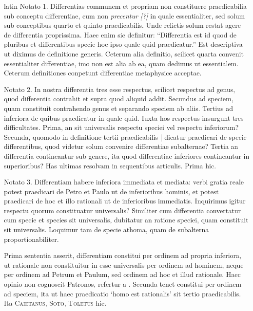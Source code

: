 \begin{otherlanguage*}{latin}
\pstart
Notato 1. Differentias communem et propriam non constituere praedicabilia sub conceptu differentiae, cum non \emph{precentur [?]} in quale essentialiter, sed solum sub conceptibus quarto et quinto praedicabilis. Unde relictis solum restat agere de differentia proprissima. Haec enim sic definitur:
\enquote{Differentia est id quod de pluribus et differentibus specie hoc ipso quale quid praedicatur.} Est descriptiva ut diximus de definitione generis. Ceterum alia definitio, scilicet quarta convenit essentialiter differentiae, imo non est alia ab ea, quam dedimus ut essentialem. Ceterum definitiones conpetunt differentiae metaphysice acceptae. 
\pend

\pstart
Notato 2. In nostra differentia tres esse respectus, scilicet respectus ad genus, quod differentia contrahit et supra quod aliquid addit. Secundus ad speciem, quam constituit contrahendo genus et separando speciem ab aliis. Tertius ad inferiora de quibus praedicatur in quale quid. Iuxta hos respectus insurgunt tres difficultates. Prima, an sit universalis respectu speciei vel respectu inferiorum? Secunda, quomodo in definitione tertii praedicabilis \textnormal{|} dicatur praedicari de specie differentibus, quod videtur solum convenire differentiae subalternae? Tertia an differentia contineantur sub genere, ita quod differentiae inferiores contineantur in superioribus? Has ultimas resolvam in sequentibus articulis. Prima hic. 
\pend

\pstart
Notato 3. Differentiam habere inferiora immediata et mediata:
verbi gratia reale potest praedicari de Petro et Paulo ut de inferioribus hominis, et potest praedicari de hoc et illo rationali ut de inferioribus immediatis. Inquirimus igitur respectu quorum constituatur universalis? Similiter cum differentia convertatur cum specie et species sit universalis, dubitatur an ratione speciei, quam constituit sit universalis. Loquimur tam de specie athoma, quam de subalterna proportionabiliter. 
\pend

\pstart
Prima sententia asserit, differentiam constitui per ordinem ad propria inferiora, ut rationale non constituitur in esse universalis per ordinem ad hominem, neque per ordinem ad Petrum et Paulum, sed ordinem ad hoc et illud rationale. Haec opinio non cognoscit Patronos, refertur a . Secunda tenet constitui per ordinem ad speciem, ita ut haec praedicatio `homo est rationalis' sit tertio praedicabilis. Ita \textsc{Caietanus}, \textsc{Soto}, \textsc{Toletus} hic. 
\pend


\end{otherlanguage*}
